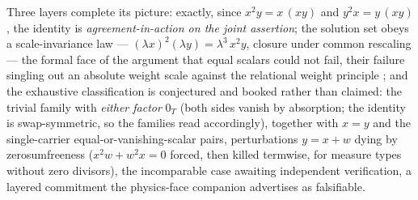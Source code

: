 Three layers complete its picture: exactly, since $x^2y = x\,(xy)$ and $y^2x = y\,(xy)$, the identity is \emph{agreement-in-action on the joint assertion}; the solution set obeys a scale-invariance law --- $(\lambda x)^2(\lambda y) = \lambda^3\,x^2y$, closure under common rescaling --- the formal face of the argument that equal scalars could not fail, their failure singling out an absolute weight scale against the relational weight principle \cite{Aethus}; and the exhaustive classification is conjectured and booked rather than claimed: the trivial family with \emph{either factor} $0_T$ (both sides vanish by absorption; the identity is swap-symmetric, so the families read accordingly), together with $x = y$ and the single-carrier equal-or-vanishing-scalar pairs, perturbations $y = x + w$ dying by zerosumfreeness ($x^2w + w^2x = 0$ forced, then killed termwise, for measure types without zero divisors), the incomparable case awaiting independent verification, a layered commitment the physics-face companion advertises as falsifiable.
